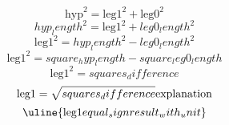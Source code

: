 \[\text{{{hyp}}}^{{2}}=\text{{{leg1}}}^{{2}}+\text{{{leg0}}}^{{2}}\]
\[{hyp_length}^{{2}}=\text{{{leg1}}}^{{2}}+{leg0_length}^{{2}}\]
\[\text{{{leg1}}}^{{2}}={hyp_length}^{{2}}-{leg0_length}^{{2}}\]
\[\text{{{leg1}}}^{{2}}={square_hyp_length}-{square_leg0_length}\]
\[\text{{{leg1}}}^{{2}}={squares_difference}\]
\[\text{{{leg1}}}=\sqrt{{\mathstrut {squares_difference}}}\text{{{explanation}}}\]
\[\uline{{\text{{{leg1}}}{equal_sign}{result_with_unit}}}\]